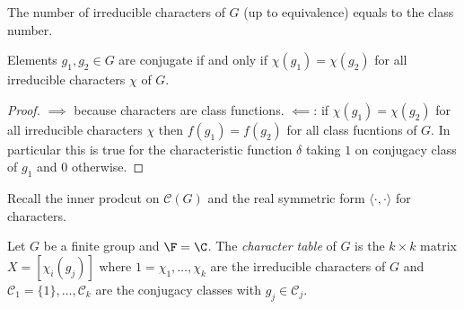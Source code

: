 \documentclass[a4paper]{article}
\newcommand{\ccl}{{\mathcal C}} %
\begin{document}
\begin{corollary}
  \label{cor:number of irreducible equals to class number}
  The number of irreducible characters of \(G\) (up to equivalence) equals to the class number.
\end{corollary}

\begin{corollary}
  Elements \(g_1, g_2 \in G\) are conjugate if and only if \(\chi(g_1) = \chi(g_2)\) for all irreducible characters \(\chi\) of \(G\).
\end{corollary}

\begin{proof}
  \(\implies\) because characters are class functions. \(\impliedby\): if \(\chi(g_1) = \chi(g_2)\) for all irreducible characters \(\chi\) then \(f(g_1) = f(g_2)\) for all class fucntions of \(G\). In particular this is true for the characteristic function \(\delta\) taking \(1\) on conjugacy class of \(g_1\) and \(0\) otherwise.
\end{proof}

Recall the inner prodcut on \(\ccl(G)\) and the real symmetric form \(\langle \cdot, \cdot \rangle\) for characters.

\begin{definition}
  Let \(G\) be a finite group and \(\F = \C\). The \emph{character table} of \(G\) is the \(k \times k\) matrix \(X = [\chi_i(g_j)]\) where \(1 = \chi_1, \dots, \chi_k\) are the irreducible characters of \(G\) and \(\ccl_1 = \{1\}, \dots, \ccl_k\) are the conjugacy classes with \(g_j \in \ccl_j\).
\end{definition}
\end{document}
